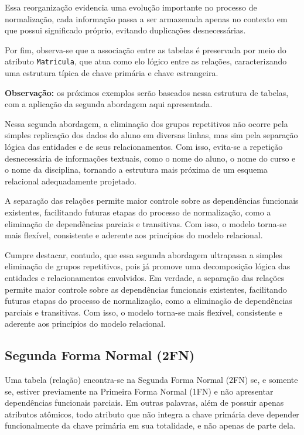 \begin{tcolorbox}[breakable, colback=blue!5,colframe=blue!40!black,title=Situação exemplo]
    \vspace{0.4cm}

    \justify

    Essa reorganização evidencia uma evolução importante no processo de normalização, cada informação passa a ser armazenada apenas no contexto em que possui significado próprio, evitando duplicações desnecessárias.

    Por fim, observa-se que a associação entre as tabelas é preservada por meio do atributo \texttt{Matricula}, que atua como elo lógico entre as relações, caracterizando uma estrutura típica de chave primária e chave estrangeira.

    \textbf{Observação:} os próximos exemplos serão baseados nessa estrutura de tabelas, com a aplicação da segunda abordagem aqui apresentada.

\end{tcolorbox}

Nessa segunda abordagem, a eliminação dos grupos repetitivos não ocorre pela simples replicação dos dados do aluno em diversas linhas, mas sim pela separação lógica das entidades e de seus relacionamentos. Com isso, evita-se a repetição desnecessária de informações textuais, como o nome do aluno, o nome do curso e o nome da disciplina, tornando a estrutura mais próxima de um esquema relacional adequadamente projetado.

A separação das relações permite maior controle sobre as dependências funcionais existentes, facilitando futuras etapas do processo de normalização, como a eliminação de dependências parciais e transitivas. Com isso, o modelo torna-se mais flexível, consistente e aderente aos princípios do modelo relacional.

Cumpre destacar, contudo, que essa segunda abordagem ultrapassa a simples eliminação de grupos repetitivos, pois já promove uma decomposição lógica das entidades e relacionamentos envolvidos. Em verdade, a separação das relações permite maior controle sobre as dependências funcionais existentes, facilitando futuras etapas do processo de normalização, como a eliminação de dependências parciais e transitivas. Com isso, o modelo torna-se mais flexível, consistente e aderente aos princípios do modelo relacional.

\subsection{Segunda Forma Normal (2FN)}
Uma tabela (relação) encontra-se na Segunda Forma Normal (2FN) se, e somente se, estiver previamente na Primeira Forma Normal (1FN) e não apresentar dependências funcionais parciais. Em outras palavras, além de possuir apenas atributos atômicos, todo atributo que não integra a chave primária deve depender funcionalmente da chave primária em sua totalidade, e não apenas de parte dela.

